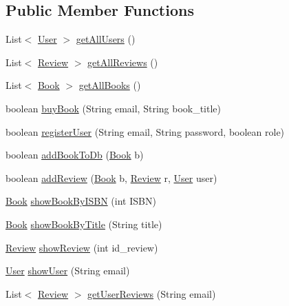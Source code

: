\subsection*{Public Member Functions}
\begin{DoxyCompactItemize}
\item 
List$<$ \hyperlink{classserver_1_1data_1_1_user}{User} $>$ \hyperlink{interfacedb_1_1_i_d_b_a39ad15619eae3d0ec652e1849e3ebd50}{get\+All\+Users} ()
\item 
List$<$ \hyperlink{classserver_1_1data_1_1_review}{Review} $>$ \hyperlink{interfacedb_1_1_i_d_b_a08f60c8b923599c650f04b4192d00d55}{get\+All\+Reviews} ()
\item 
List$<$ \hyperlink{classserver_1_1data_1_1_book}{Book} $>$ \hyperlink{interfacedb_1_1_i_d_b_abd0d41674bbcdd524a3ca2403504bf25}{get\+All\+Books} ()
\item 
boolean \hyperlink{interfacedb_1_1_i_d_b_a2ac985a90e8369fab676950b3fb4c2bc}{buy\+Book} (String email, String book\+\_\+title)
\item 
boolean \hyperlink{interfacedb_1_1_i_d_b_a92913d9357ef22978adc35d3fb9d3590}{register\+User} (String email, String password, boolean role)
\item 
boolean \hyperlink{interfacedb_1_1_i_d_b_a63904b26597f651ea6acbd03384e0afb}{add\+Book\+To\+Db} (\hyperlink{classserver_1_1data_1_1_book}{Book} b)
\item 
boolean \hyperlink{interfacedb_1_1_i_d_b_a00a453c6d4fc604615f5a173d86600fc}{add\+Review} (\hyperlink{classserver_1_1data_1_1_book}{Book} b, \hyperlink{classserver_1_1data_1_1_review}{Review} r, \hyperlink{classserver_1_1data_1_1_user}{User} user)
\item 
\hyperlink{classserver_1_1data_1_1_book}{Book} \hyperlink{interfacedb_1_1_i_d_b_aed305f6c36ff140084636a8eded479db}{show\+Book\+By\+I\+S\+BN} (int I\+S\+BN)
\item 
\hyperlink{classserver_1_1data_1_1_book}{Book} \hyperlink{interfacedb_1_1_i_d_b_a6418edaf7c25f99f0422c0000db521fa}{show\+Book\+By\+Title} (String title)
\item 
\hyperlink{classserver_1_1data_1_1_review}{Review} \hyperlink{interfacedb_1_1_i_d_b_a6c44c3135f07ec6dbef84ecc6fe4f90f}{show\+Review} (int id\+\_\+review)
\item 
\hyperlink{classserver_1_1data_1_1_user}{User} \hyperlink{interfacedb_1_1_i_d_b_a8dca82226b1c27ceb4b765259546513d}{show\+User} (String email)
\item 
List$<$ \hyperlink{classserver_1_1data_1_1_review}{Review} $>$ \hyperlink{interfacedb_1_1_i_d_b_afd7ee8924344c13a64a1363d1a295771}{get\+User\+Reviews} (String email)

\end{DoxyCompactItemize}
